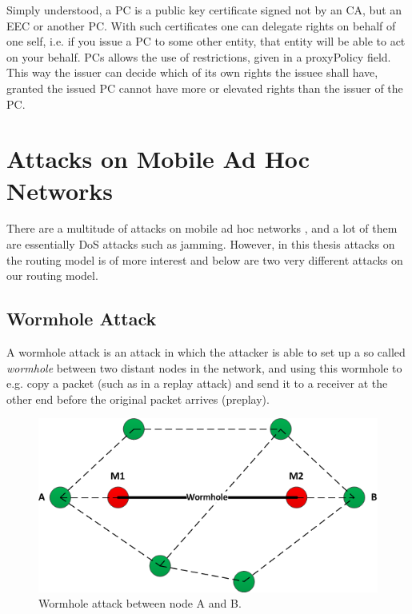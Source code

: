 Simply understood, a \ac{PC} is a public key certificate signed not
by an \ac{CA}, but an \ac{EEC} or another \ac{PC}. With such certificates one
can delegate rights on behalf of one self, i.e. if you issue a \ac{PC} to some
other entity, that entity will be able to act on your behalf. \acp{PC} allows
the use of restrictions, given in a proxyPolicy field. This way the issuer can
decide which of its own rights the issuee shall have, granted the issued \ac{PC}
cannot have more or elevated rights than the issuer of the \ac{PC}.

\section{Attacks on Mobile Ad Hoc Networks}
There are a multitude of attacks on mobile ad hoc networks
\cite{goyal2010literature}, and a lot of them are essentially \ac{DoS} attacks
such as jamming. However, in this thesis attacks on the routing model is of
more interest and below are two very different attacks on our routing model.

\subsection{Wormhole Attack}
A wormhole attack is an attack in which the attacker is able to set up a so
called \emph{wormhole} between two distant nodes in the network, and using this
wormhole to e.g. copy a packet (such as in a replay attack) and send it to a
receiver at the other end before the original packet arrives (preplay).

\begin{figure}[h]
	\centering
  	\includegraphics[width=\textwidth]{images/wormhole_attack.png}
  	\caption{Wormhole attack between node A and B.}
	\label{fig:wormhole_attack}
\end{figure}

